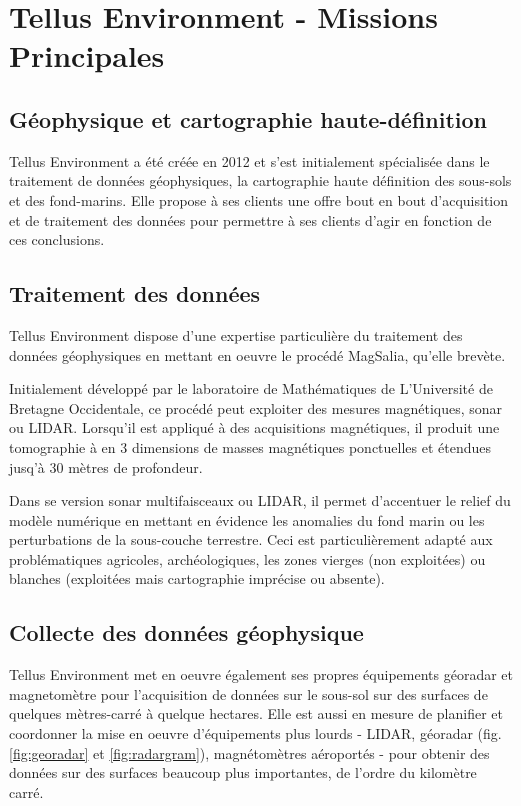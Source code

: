 \documentclass[12pt,a4paper]{report}
\begin{document}
	\section{Tellus Environment - Missions Principales}

	\subsection{Géophysique et cartographie haute-définition}
	Tellus Environment a été créée en 2012 et s'est initialement spécialisée dans le traitement de données géophysiques, la cartographie haute définition des sous-sols et des fond-marins. Elle propose à ses clients une offre bout en bout d'acquisition et de traitement des données pour permettre à ses clients d'agir en fonction de ces conclusions.
	
	\subsection{Traitement des données}
	Tellus Environment dispose d'une expertise particulière du traitement des données géophysiques en mettant en oeuvre le procédé MagSalia, qu'elle brevète.
	
	\para Initialement développé par le laboratoire de Mathématiques de L'Université de Bretagne Occidentale, ce procédé peut exploiter des mesures magnétiques, sonar ou LIDAR. Lorsqu'il est appliqué à des acquisitions magnétiques, il produit une tomographie à en 3 dimensions de masses magnétiques ponctuelles et étendues jusq'à 30 mètres de profondeur.
	
	\para Dans se version sonar multifaisceaux ou LIDAR, il permet d'accentuer le relief du modèle numérique en mettant en évidence les anomalies du fond marin ou les perturbations de la sous-couche terrestre. Ceci est particulièrement adapté aux problématiques agricoles, archéologiques, les zones vierges (non exploitées) ou blanches (exploitées mais cartographie imprécise ou absente).
	
	\subsection{Collecte des données géophysique}
	
	\para Tellus Environment met en oeuvre également ses propres équipements géoradar et magnetomètre pour l'acquisition de données sur le sous-sol sur des surfaces de quelques mètres-carré à quelque hectares. Elle est aussi en mesure de planifier et coordonner la mise en oeuvre d'équipements plus lourds - LIDAR, géoradar (fig. \ref{fig:georadar} et \ref{fig:radargram}), magnétomètres aéroportés - pour obtenir des données sur des surfaces beaucoup plus importantes, de l'ordre du kilomètre carré.
	
\end{document}
